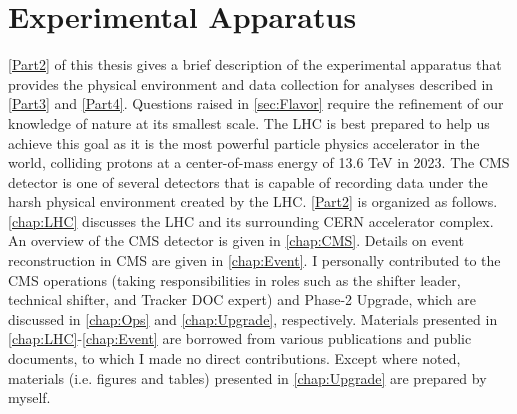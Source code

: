 \part{Experimental Apparatus}
\label{Part2}
\autoref{Part2} of this thesis gives a brief description of the experimental apparatus that provides the physical environment and data collection for analyses described in \autoref{Part3} and \autoref{Part4}. Questions raised in \autoref{sec:Flavor} require the refinement of our knowledge of nature at its smallest scale. The \ac{LHC} is best prepared to help us achieve this goal as it is the most powerful particle physics accelerator in the world, colliding protons at a center-of-mass energy of 13.6 TeV in 2023. The \ac{CMS} detector is one of several detectors that is capable of recording data under the harsh physical environment created by the \ac{LHC}. \autoref{Part2} is organized as follows. \autoref{chap:LHC} discusses the \ac{LHC} and its surrounding \ac{CERN} accelerator complex. An overview of the \ac{CMS} detector is given in \autoref{chap:CMS}. Details on event reconstruction in \ac{CMS} are given in \autoref{chap:Event}. I personally contributed to the \ac{CMS} operations (taking responsibilities in roles such as the shifter leader, technical shifter, and Tracker \ac{DOC} expert) and Phase-2 Upgrade, which are discussed in \autoref{chap:Ops} and \autoref{chap:Upgrade}, respectively. Materials presented in \autoref{chap:LHC}-\autoref{chap:Event} are borrowed from various publications and public documents, to which I made no direct contributions. Except where noted, materials (i.e. figures and tables) presented in \autoref{chap:Upgrade} are prepared by myself.





